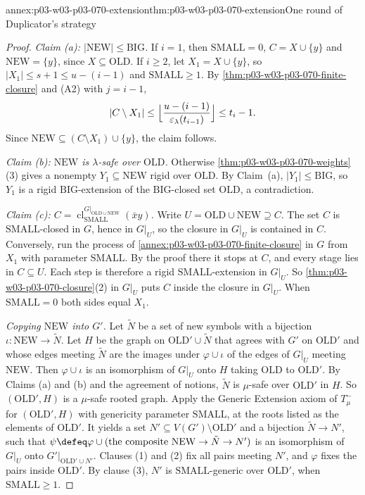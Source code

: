 \begin{annexitem}{annex:p03-w03-p03-070-extension}{thm:p03-w03-p03-070-extension}{One round of Duplicator's strategy}
\begin{proof}
\emph{Claim (a): \(|\mathrm{NEW}|\leq\mathrm{BIG}\).}  If \(i=1\), then
\(\mathrm{SMALL}=0\), \(C=X\cup\{y\}\) and \(\mathrm{NEW}=\{y\}\), since
\(X\subseteq\mathrm{OLD}\).  If \(i\geq2\), let \(X_1=X\cup\{y\}\), so
\(|X_1|\leq s+1\leq u-(i-1)\) and \(\mathrm{SMALL}\geq1\).  By
\cref{thm:p03-w03-p03-070-finite-closure} and (A2) with \(j=i-1\),
\[
 |C\setminus X_1|\leq\Bigl\lfloor\frac{u-(i-1)}{\varepsilon_\lambda(t_{i-1})}\Bigr\rfloor
 \leq t_i-1 .
\]
Since \(\mathrm{NEW}\subseteq(C\setminus X_1)\cup\{y\}\), the claim follows.

\emph{Claim (b): \(\mathrm{NEW}\) is \(\lambda\)-safe over \(\mathrm{OLD}\).}
Otherwise \cref{thm:p03-w03-p03-070-weights}(3) gives a nonempty
\(Y_1\subseteq\mathrm{NEW}\) rigid over \(\mathrm{OLD}\).  By Claim~(a),
\(|Y_1|\leq\mathrm{BIG}\), so \(Y_1\) is a rigid \(\mathrm{BIG}\)-extension
of the \(\mathrm{BIG}\)-closed set \(\mathrm{OLD}\), a contradiction.

\emph{Claim (c): \(C=\operatorname{cl}^{G|_{\mathrm{OLD}\cup\mathrm{NEW}}}_{\mathrm{SMALL}}(\bar xy)\).}
Write \(U=\mathrm{OLD}\cup\mathrm{NEW}\supseteq C\).  The set \(C\) is
\(\mathrm{SMALL}\)-closed in \(G\), hence in \(G|_U\), so the closure in
\(G|_U\) is contained in \(C\).  Conversely, run the process of
\cref{annex:p03-w03-p03-070-finite-closure} in \(G\) from \(X_1\) with
parameter \(\mathrm{SMALL}\).  By the proof there it stops at \(C\), and every
stage lies in \(C\subseteq U\).  Each step is therefore a rigid
\(\mathrm{SMALL}\)-extension in \(G|_U\).  So
\cref{thm:p03-w03-p03-070-closure}(2) in \(G|_U\) puts \(C\) inside the closure
in \(G|_U\).  When \(\mathrm{SMALL}=0\) both sides equal \(X_1\).

\emph{Copying \(\mathrm{NEW}\) into \(G'\).}  Let \(\tilde N\) be a set of new
symbols with a bijection \(\iota:\mathrm{NEW}\to\tilde N\).  Let \(H\) be the
graph on \(\mathrm{OLD}'\cup\tilde N\) that agrees with \(G'\) on
\(\mathrm{OLD}'\) and whose edges meeting \(\tilde N\) are the images under
\(\varphi\cup\iota\) of the edges of \(G|_U\) meeting \(\mathrm{NEW}\).  Then
\(\varphi\cup\iota\) is an isomorphism of \(G|_U\) onto \(H\) taking
\(\mathrm{OLD}\) to \(\mathrm{OLD}'\).  By Claims (a) and (b) and the agreement
of notions, \(\tilde N\) is \(\mu\)-safe over \(\mathrm{OLD}'\) in \(H\).  So
\((\mathrm{OLD}',H)\) is a \(\mu\)-safe rooted graph.  Apply the Generic
Extension axiom of \(T^-_\mu\) for \((\mathrm{OLD}',H)\) with genericity
parameter \(\mathrm{SMALL}\), at the roots listed as the elements of
\(\mathrm{OLD}'\).  It yields a set \(N'\subseteq V(G')\setminus\mathrm{OLD}'\)
and a bijection \(\tilde N\to N'\), such that
\(\psi\defeq\varphi\cup(\text{the composite }\mathrm{NEW}\to\tilde N\to N')\)
is an isomorphism of \(G|_U\) onto \(G'|_{\mathrm{OLD}'\cup N'}\).  Clauses
(1) and (2) fix all pairs meeting \(N'\), and \(\varphi\) fixes the pairs
inside \(\mathrm{OLD}'\).  By clause (3), \(N'\) is
\(\mathrm{SMALL}\)-generic over \(\mathrm{OLD}'\), when
\(\mathrm{SMALL}\geq1\).


\end{proof}
\end{annexitem}
